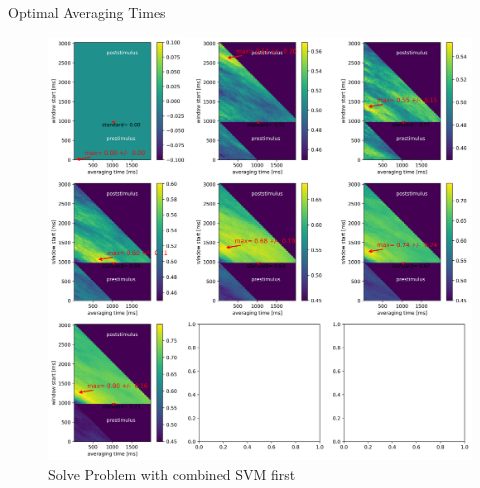 \documentclass[10pt]{beamer}
\begin{document}
\begin{frame}[fragile]{Optimal Averaging Times}
\begin{center}
	\begin{figure}
	\caption*{Solve Problem with combined SVM first}
      \includegraphics[width=1.0\textwidth]{placeholder_wind_pres.png}
	\end{figure}
	\end{center}
\end{frame}
\end{document}
